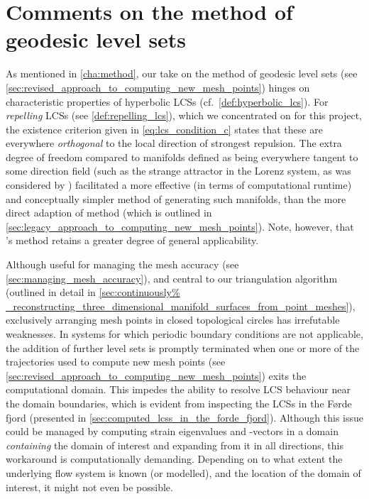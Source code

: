 \section{Comments on the method of geodesic level sets}
\label{sec:comments_on_the_method_of_geodesic_level_sets}
%
As mentioned in \cref{cha:method}, our take on the method of geodesic level
sets (see \cref{sec:revised_approach_to_computing_new_mesh_points}) hinges on
characteristic properties of hyperbolic LCSs (cf.\ \cref{def:hyperbolic_lcs}).
For \emph{repelling} LCSs (see \cref{def:repelling_lcs}), which we concentrated
on for this project, the existence criterion given in \cref{eq:lcs_condition_c}
states that these are everywhere \emph{orthogonal} to the local direction of
strongest repulsion. The extra degree of freedom compared to manifolds defined
as being everywhere tangent to some direction field (such as the strange
attractor in the Lorenz system, as was considered by
\textcite{krauskopf2005survey}) facilitated a more effective (in terms of
computational runtime) and conceptually simpler method of generating such
manifolds, than the more direct adaption of 
method (which is outlined in
\cref{sec:legacy_approach_to_computing_new_mesh_points}). Note, however, that
\citeauthor{krauskopf2005survey}'s method retains a greater degree of general
applicability.

Although useful for managing the mesh accuracy (see
\cref{sec:managing_mesh_accuracy}), and central to our
triangulation algorithm (outlined in detail in \cref{sec:continuously%
_reconstructing_three_dimensional_manifold_surfaces_from_point_meshes}),
exclusively arranging mesh points in closed topological circles has irrefutable
weaknesses. In systems for which periodic boundary conditions are not
applicable, the addition of further level sets is promptly terminated when one
or more of the trajectories used to compute new mesh points (see
\cref{sec:revised_approach_to_computing_new_mesh_points}) exits the
computational domain. This impedes the ability to resolve LCS behaviour near
the domain boundaries, which is evident from inspecting the LCSs in the Førde
fjord (presented in \cref{sec:computed_lcss_in_the_forde_fjord}). Although this
issue could be managed by computing strain eigenvalues and -vectors in a domain
\emph{containing} the domain of interest and expanding from it in all
directions, this workaround is computationally demanding. Depending on to what
extent the underlying flow system is known (or modelled), and the location of
the domain of interest, it might not even be possible.


